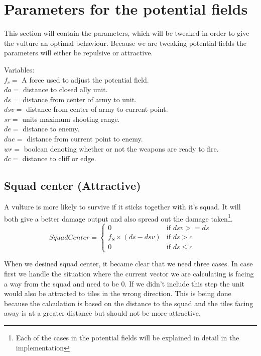 \section{Parameters for the potential fields}
	This section will contain the parameters, which will be tweaked in order to give the vulture an optimal behaviour. Because we are tweaking 
	potential fields the parameters will either be repulsive or attractive.
	
	Variables:\\
	$f_c =$ A force used to adjust the potential field.\\
	$da =$ distance to closed ally unit.\\
	$ds =$ distance from center of army to unit.\\
	$dsv =$ distance from center of army to current point.\\
	$sr =$ units maximum shooting range.\\
	$de =$ distance to enemy.\\
	$due =$ distance from current point to enemy.\\
	$wr =$ boolean denoting whether or not the weapons are ready to fire.\\
	$dc =$ distance to cliff or edge.
	
	\subsection*{Squad center (Attractive)}
		\label{SCA_label}A vulture is more likely to survive if it sticks together with it's squad. It will both give a better damage output and also spread out the 
		damage taken\footnote{Each of the cases in the potential fields will be explained in detail in the implementation}.
		\begin{displaymath}
			SquadCenter  = \begin{cases}
					0 & \text{if } dsv >= ds\\
					f_{S} \times (ds - dsv) & \text{if } ds > c\\
					0 & \text{if } ds \leq c
				\end{cases}		
		\end{displaymath}
		
		When we desined squad center, it became clear that we need three cases. 
		In case first we handle the situation where the current vector we are calculating is facing a way from the squad and need to be 0. If we didn't include this step the unit would also be attracted to tiles in the wrong direction. This is being done because the calculation is based on the distance to the squad and the tiles facing away is at a greater distance but should not be more attractive.
		
